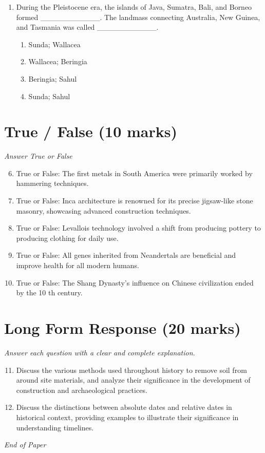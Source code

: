 \documentclass[12pt]{article}
\begin{document}
\begin{enumerate}[label=\arabic*.]
\begin{enumerate}[label=(\alph*)]
    \item 600,000 to 30,000 years ago.
    \item 400,000 to 10,000 years ago.
    \item 100,000 to 10,000 years ago.
\end{enumerate}
\item During the Pleistocene era, the islands of Java, Sumatra, Bali, and Borneo formed \_\_\_\_\_\_\_\_\_\_\_. The landmass connecting Australia, New Guinea, and Tasmania was called \_\_\_\_\_\_\_\_\_\_\_.
\begin{enumerate}[label=(\alph*)]
    \item Sunda; Wallacea
    \item Wallacea; Beringia
    \item Beringia; Sahul
    \item Sunda; Sahul
\end{enumerate}
\end{enumerate}

\section*{True / False (10 marks)}
\textit{Answer True or False}
\begin{enumerate}[label=\arabic*.]
\setcounter{enumi}{5}
\item True or False: The first metals in South America were primarily worked by hammering techniques.
\item True or False: Inca architecture is renowned for its precise jigsaw-like stone masonry, showcasing advanced construction techniques.
\item True or False: Levallois technology involved a shift from producing pottery to producing clothing for daily use.
\item True or False: All genes inherited from Neandertals are beneficial and improve health for all modern humans.
\item True or False: The Shang Dynasty's influence on Chinese civilization ended by the 10 th century.
\end{enumerate}

\section*{Long Form Response (20 marks)}
\textit{Answer each question with a clear and complete explanation.}
\begin{enumerate}[label=\arabic*.]
\setcounter{enumi}{10}
\item Discuss the various methods used throughout history to remove soil from around site materials, and analyze their significance in the development of construction and archaeological practices.
\item Discuss the distinctions between absolute dates and relative dates in historical context, providing examples to illustrate their significance in understanding timelines.
\end{enumerate}

\vfill
\noindent\textit{End of Paper}
\end{document}

